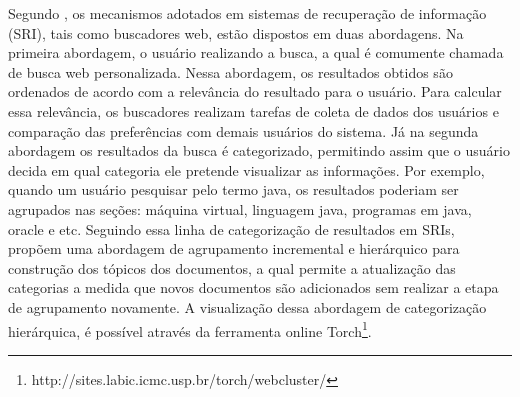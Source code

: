 Segundo \cite{Matsumoto10}, os mecanismos adotados em sistemas de recuperação de informação
(SRI), tais como buscadores web, estão dispostos em duas abordagens. Na primeira abordagem,
o usuário realizando a busca, a qual é comumente chamada de busca web personalizada.  Nessa
abordagem, os resultados obtidos são ordenados de acordo com a relevância do resultado para o
usuário. Para calcular essa relevância, os buscadores realizam tarefas de coleta de dados dos
usuários e comparação das preferências com demais usuários do sistema. Já na segunda
abordagem os resultados da busca é categorizado, permitindo assim que o usuário decida em
qual categoria ele pretende visualizar as informações. Por exemplo, quando um usuário pesquisar pelo
termo java, os resultados poderiam ser agrupados nas seções: máquina virtual, linguagem java,
programas em java, oracle e etc. Seguindo essa linha de categorização de resultados em SRIs,
\cite{MarcaciniR10} propõem uma abordagem de agrupamento incremental e hierárquico para construção
dos tópicos dos documentos, a qual permite a atualização das categorias a medida que novos
documentos são adicionados sem realizar a etapa de agrupamento novamente. A visualização
dessa abordagem de categorização hierárquica, é possível através da ferramenta online
Torch\footnote{http://sites.labic.icmc.usp.br/torch/webcluster/}.

